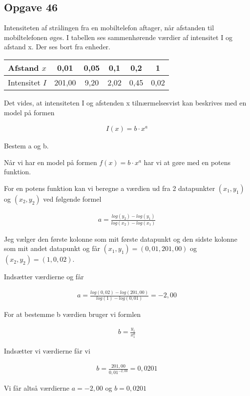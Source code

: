 \subsection{Opgave 46}

Intensiteten af strålingen fra en mobiltelefon aftager, når afstanden til mobiltelefonen øges. I tabellen ses sammenhørende værdier af intensitet I og afstand x. Der ses bort fra enheder.

\begin{tabular}{|c|c|c|c|c|c|}
    \hline
    Afstand $x$ & 0,01 & 0,05 & 0,1 & 0,2 & 1 \\\hline
    Intensitet $I$ & 201,00 & 9,20 & 2,02 & 0,45 & 0,02 \\\hline
\end{tabular}

Det vides, at intensiteten I og afstenden x tilnærmelsesvist kan beskrives med en model på formen 

\begin{align*}
    I(x)=b\cdot x^a
\end{align*}

Bestem a og b.

\ans

Når vi har en model på formen $f(x) = b\cdot x^a$ har vi at gøre med en potens funktion.

For en potens funktion kan vi beregne a værdien ud fra 2 datapunkter $(x_1, y_1)$ og $(x_2, y_2)$ ved følgende formel

\begin{align*}
    a = \frac{log(y_2) - log(y_1)}{log(x_2) - log(x_1)}
\end{align*}

Jeg vælger den første kolonne som mit første datapunkt og den sidste kolonne som mit andet datapunkt og får
$(x_1, y_1) = (0,01, 201,00)$ og $(x_2, y_2) = (1, 0,02)$.

Indsætter værdierne og får

\begin{align*}
    a = \frac{log(0,02) - log(201,00)}{log(1) - log(0,01)} = -2,00 
\end{align*}

For at bestemme b værdien bruger vi formlen 

\begin{align*}
    b = \frac{y_1}{x_1^a}
\end{align*}

Indsætter vi værdierne får vi

\begin{align*}
    b = \frac{201,00}{0,01^{-2,00}} = 0,0201
\end{align*}

Vi får altså værdierne $a = -2,00$ og $b = 0,0201$